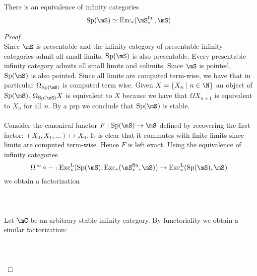 \documentclass[a4paper]{article}
\begin{document}
\begin{thm}{}{} There is an equivalence of infinity categories $$\text{Sp}(\mS)\simeq\text{Exc}_\ast(\mS_\ast^\text{fin},\mS)$$ \tcbline
\begin{proof}~\\
Since $\mS$ is presentable and the infinity category of presentable infinity categories admit all small limits, $\text{Sp}(\mS)$ is also presentable. Every presentable infinity category admits all small limits and colimits. Since $\mS$ is pointed, $\text{Sp}(\mS)$ is also pointed. Since all limits are computed term-wise, we have that in particular $\Omega_{\text{Sp}(\mS)}$ is computed term wise. Given $X=\{X_n\;|\;n\in\N\}$ an object of $\text{Sp}(\mS)$, $\Omega_{\text{Sp}(\mS)}X$ is equivalent to $X$ because we have that $\Omega X_{n+1}$ is equivalent to $X_n$ for all $n$. By a prp we conclude that $\text{Sp}(\mS)$ is stable. \\~\\

Consider the canonical functor $F:\text{Sp}(\mS)\to\mS$ defined by recovering the first factor: $(X_0,X_1,\dots)\mapsto X_0$. It is clear that it commutes with finite limits since limits are computed term-wise. Hence $F$ is left exact. Using the equivalence of infinity categories $$\Omega^\infty\circ-:\text{Exc}_\ast^\text{L}(\text{Sp}(\mS),\text{Exc}_\ast(\mS_\ast^\text{fin},\mS))\to\text{Exc}_\ast^{\text{L}}(\text{Sp}(\mS),\mS)$$ we obtain a factorization \\~\\
\\~\\
Let $\mC$ be an arbitrary stable infinity category. By functoriality we obtain a similar factorization: \\~\\
\\~\\


\end{proof}
\end{thm}
\end{document}
